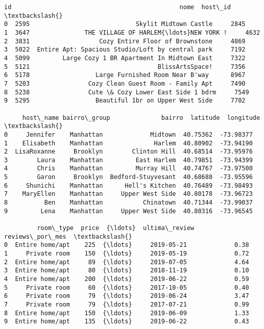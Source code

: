 \documentclass[11pt]{article}
\makeatletter
\newcommand{\boxspacing}{\kern\kvtcb@left@rule\kern\kvtcb@boxsep}
\newcommand{\prompt}[4]{
        {\ttfamily\llap{{\color{#2}[#3]:\hspace{3pt}#4}}\vspace{-\baselineskip}}
    }
\makeatother
\begin{document}
            \begin{tcolorbox}[breakable, size=fbox, boxrule=.5pt, pad at break*=1mm, opacityfill=0]
\prompt{Out}{outcolor}{284}{\boxspacing}
\begin{Verbatim}[commandchars=\\\{\}]
     id                                              nome  host\_id  \textbackslash{}
0  2595                             Skylit Midtown Castle     2845
1  3647               THE VILLAGE OF HARLEM{\ldots}NEW YORK !     4632
2  3831                   Cozy Entire Floor of Brownstone     4869
3  5022  Entire Apt: Spacious Studio/Loft by central park     7192
4  5099         Large Cozy 1 BR Apartment In Midtown East     7322
5  5121                                   BlissArtsSpace!     7356
6  5178                  Large Furnished Room Near B'way      8967
7  5203                Cozy Clean Guest Room - Family Apt     7490
8  5238                Cute \& Cozy Lower East Side 1 bdrm     7549
9  5295                  Beautiful 1br on Upper West Side     7702

     host\_name bairro\_group              bairro  latitude  longitude  \textbackslash{}
0     Jennifer    Manhattan             Midtown  40.75362  -73.98377
1    Elisabeth    Manhattan              Harlem  40.80902  -73.94190
2  LisaRoxanne     Brooklyn        Clinton Hill  40.68514  -73.95976
3        Laura    Manhattan         East Harlem  40.79851  -73.94399
4        Chris    Manhattan         Murray Hill  40.74767  -73.97500
5        Garon     Brooklyn  Bedford-Stuyvesant  40.68688  -73.95596
6     Shunichi    Manhattan      Hell's Kitchen  40.76489  -73.98493
7    MaryEllen    Manhattan     Upper West Side  40.80178  -73.96723
8          Ben    Manhattan           Chinatown  40.71344  -73.99037
9         Lena    Manhattan     Upper West Side  40.80316  -73.96545

         room\_type  price  {\ldots}  ultima\_review  reviews\_por\_mes  \textbackslash{}
0  Entire home/apt    225  {\ldots}     2019-05-21             0.38
1     Private room    150  {\ldots}     2019-05-19             0.72
2  Entire home/apt     89  {\ldots}     2019-07-05             4.64
3  Entire home/apt     80  {\ldots}     2018-11-19             0.10
4  Entire home/apt    200  {\ldots}     2019-06-22             0.59
5     Private room     60  {\ldots}     2017-10-05             0.40
6     Private room     79  {\ldots}     2019-06-24             3.47
7     Private room     79  {\ldots}     2017-07-21             0.99
8  Entire home/apt    150  {\ldots}     2019-06-09             1.33
9  Entire home/apt    135  {\ldots}     2019-06-22             0.43


\end{Verbatim}
\end{tcolorbox}
\end{document}
